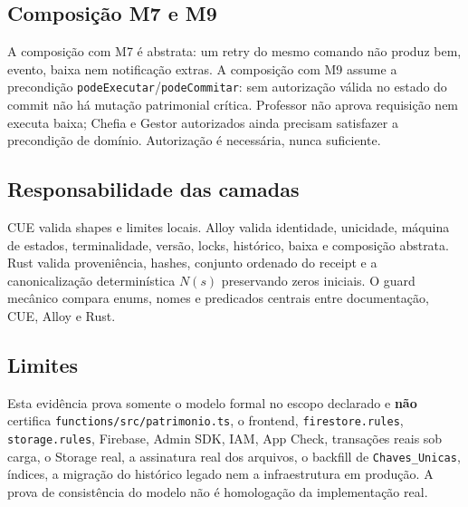 \subsection*{Composição M7 e M9}
A composição com M7 é abstrata: um retry do mesmo comando não produz bem,
evento, baixa nem notificação extras. A composição com M9 assume a precondição
\texttt{podeExecutar}/\texttt{podeCommitar}: sem autorização válida no estado do
commit não há mutação patrimonial crítica. Professor não aprova requisição nem
executa baixa; Chefia e Gestor autorizados ainda precisam satisfazer a
precondição de domínio. Autorização é necessária, nunca suficiente.

\subsection*{Responsabilidade das camadas}
CUE valida shapes e limites locais. Alloy valida identidade, unicidade,
máquina de estados, terminalidade, versão, locks, histórico, baixa e composição
abstrata. Rust valida proveniência, hashes, conjunto ordenado do receipt e a
canonicalização determinística $N(s)$ preservando zeros iniciais. O guard
mecânico compara enums, nomes e predicados centrais entre documentação, CUE,
Alloy e Rust.

\begingroup\small\raggedright


\par\endgroup

\subsection*{Limites}
Esta evidência prova somente o modelo formal no escopo declarado e \textbf{não}
certifica \texttt{functions/}\allowbreak\texttt{src/}\allowbreak\texttt{patrimonio.ts}, o frontend, \texttt{firestore.rules},
\texttt{storage.rules}, Firebase, Admin SDK, IAM, App Check, transações reais
sob carga, o Storage real, a assinatura real dos arquivos, o backfill de
\texttt{Chaves\_Unicas}, índices, a migração do histórico legado nem a
infraestrutura em produção. A prova de consistência do modelo não é homologação
da implementação real.
\fussy
